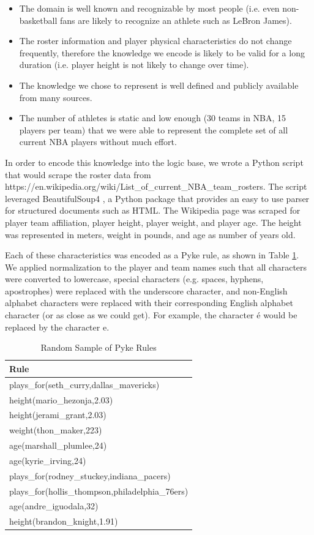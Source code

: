 \documentclass{chi2009}
\begin{document}
\begin{itemize}
\item The domain is well known and recognizable by most people (i.e. even non-basketball fans are likely to recognize an athlete such as LeBron James).
\item The roster information and player physical characteristics do not change frequently, therefore the knowledge we encode is likely to be valid for a long duration (i.e. player height is not likely to change over time).
\item The knowledge we chose to represent is well defined and publicly available from many sources.
\item The number of athletes is static and low enough (30 teams in NBA, 15 players per team) that we were able to represent the complete set of all current NBA players without much effort.
\end{itemize}

In order to encode this knowledge into the logic base, we wrote a Python script that would scrape the roster data from https://en.wikipedia.org/wiki/List\_of\_current\_NBA\_team\_rosters.  The script leveraged BeautifulSoup4 \cite{beautifulsoup}, a Python package that provides an easy to use parser for structured documents such as HTML.  The Wikipedia page was scraped for player team affiliation, player height, player weight, and player age.  The height was represented in meters, weight in pounds, and age as number of years old.  

Each of these characteristics was encoded as a Pyke rule, as shown in Table \ref{tableRules}.  We applied normalization to the player and team names such that all characters were converted to lowercase, special characters (e.g. spaces, hyphens, apostrophes) were replaced with the underscore character, and non-English alphabet characters were replaced with their corresponding English alphabet character (or as close as we could get).  For example, the character é would be replaced by the character e.

\begin{table}
\begin{center}
\begin{tabular}{ | l | }
\hline
Rule \\
\hline 
plays\_for(seth\_curry,dallas\_mavericks) \\
height(mario\_hezonja,2.03) \\
height(jerami\_grant,2.03) \\
weight(thon\_maker,223) \\
age(marshall\_plumlee,24) \\
age(kyrie\_irving,24) \\
plays\_for(rodney\_stuckey,indiana\_pacers) \\
plays\_for(hollis\_thompson,philadelphia\_76ers) \\
age(andre\_iguodala,32) \\
height(brandon\_knight,1.91) \\
\hline
\end{tabular}
\caption{Random Sample of Pyke Rules}
\label{tableRules}
\end{center}
\end{table}
\end{document}
